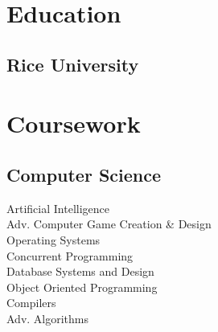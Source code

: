 \documentclass[letterpaper]{deedy-resume} %
\begin{document}

\lastupdated %



\begin{minipage}[t]{0.33\textwidth} %


\section{Education} 

\subsection{Rice University}



\section{Coursework}

\subsection{Computer Science}
Artificial Intelligence\\
Adv. Computer Game Creation \& Design\\
Operating Systems\\
Concurrent Programming\\
Database Systems and Design\\
Object Oriented Programming\\
Compilers\\
Adv. Algorithms\\


\end{minipage}
\end{document}

